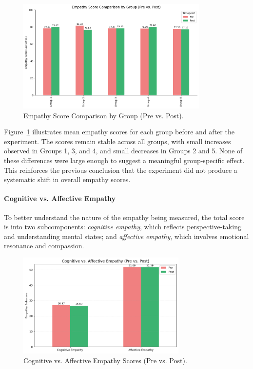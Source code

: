 \begin{figure}[htbp]
    \centering
    \includegraphics[width=0.85\textwidth]{../../Figures/emph-scores-comp-grp.png}
    \caption{Empathy Score Comparison by Group (Pre vs. Post).}
    \label{fig:empathy_group_bar}
\end{figure}

\vspace{1em}

Figure~\ref{fig:empathy_group_bar} illustrates mean empathy scores for each group before and after the experiment. The scores remain stable across all groups, with small increases observed in Groups 1, 3, and 4, and small decreases in Groups 2 and 5. None of these differences were large enough to suggest a meaningful group-specific effect. This reinforces the previous conclusion that the experiment did not produce a systematic shift in overall empathy scores.

\paragraph{Cognitive vs. Affective Empathy}

To better understand the nature of the empathy being measured, the total score is into two subcomponents: \textit{cognitive empathy}, which reflects perspective-taking and understanding mental states; and \textit{affective empathy}, which involves emotional resonance and compassion.

\begin{figure}[htbp]
    \centering
    \includegraphics[width=0.75\textwidth]{../../Figures/cog-vs-affect.png}
    \caption{Cognitive vs. Affective Empathy Scores (Pre vs. Post).}
    \label{fig:empathy_cog_aff}
\end{figure}

